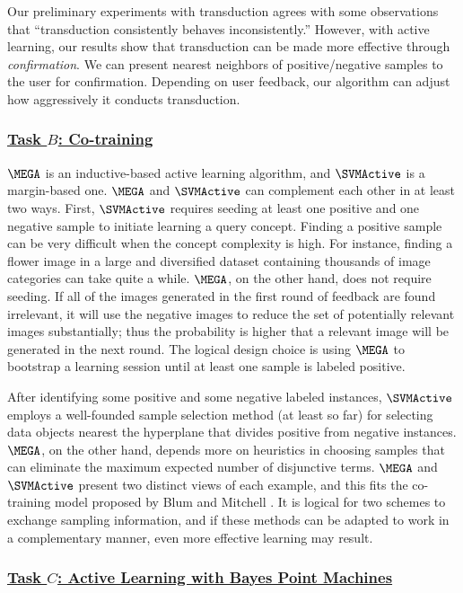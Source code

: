 Our preliminary experiments with transduction agrees with 
some observations \cite{GHK00} that ``transduction consistently behaves 
inconsistently.''  However, with active learning, 
our results show that transduction can be made more effective
through {\em confirmation}. 
We can present nearest neighbors of positive/negative samples
to the user for confirmation.  
Depending on user feedback, our algorithm can adjust
how aggressively it conducts transduction.

\subsubsection*{\underline{Task $B$: Co-training}}

$\MEGA$ is an inductive-based active learning algorithm, and $\SVMActive$
is a margin-based one.
$\MEGA$ and $\SVMActive$ can complement each other in 
at least two ways.  
First, $\SVMActive$ requires seeding at least one
positive and one negative sample to initiate learning
a query concept.  Finding a positive sample can be very difficult 
when the concept complexity is high.  For instance, 
finding a flower image in a large and diversified 
dataset containing thousands of image categories
can take quite a while.  $\MEGA$, on the other hand, does not
require seeding.  If all of the images
generated in the first round of feedback are found irrelevant,
it will use the negative images to reduce the set of potentially
relevant images substantially; thus the
probability is higher that a relevant image will be
generated in the next round.
The logical design choice is using $\MEGA$ to bootstrap
a learning session until at least one sample
is labeled positive.

After identifying some positive and some negative labeled instances,
$\SVMActive$ employs a well-founded 
sample selection method (at least so far) for selecting 
data objects nearest the hyperplane 
that divides positive from
negative instances. $\MEGA$, on the other hand, 
depends more on heuristics in choosing samples
that can eliminate the maximum expected number of
disjunctive terms.  
$\MEGA$ and $\SVMActive$ present two distinct views
of each example, and this fits the co-training model
proposed by Blum and Mitchell \cite{BM98}.
It is logical for two schemes
to exchange sampling information, and if these
methods can be adapted to work
in a complementary manner, even more effective
learning may result.

\subsubsection*{\underline{Task $C$: Active Learning with Bayes Point Machines}}

